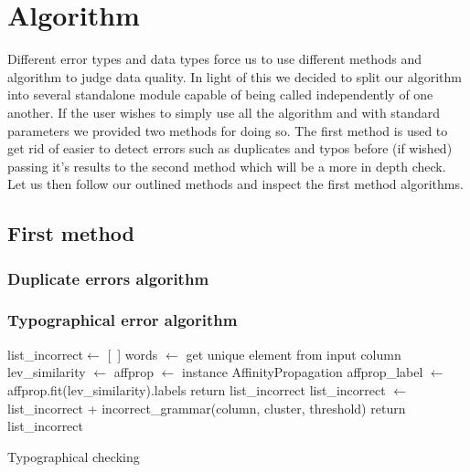 \documentclass{article}
\begin{document}
\section{Algorithm}
\label{sec:Algorithm}
Different error types and data types force us to use different methods and algorithm to judge data quality. In light of this we decided to split our algorithm into several standalone module capable of being called independently of one another.
If the user wishes to simply use all the algorithm and with standard parameters we provided two methods for doing so. The first method is used to get rid of easier to detect errors such as duplicates and typos before (if wished) passing it's results to the second method which will be a more in depth check.
Let us then follow our outlined methods and inspect the first method algorithms.


\subsection{First method}
\subsubsection{Duplicate errors algorithm}
\subsubsection{Typographical error algorithm}

\begin{algorithm}
\BlankLine

list\_incorrect$\leftarrow$ [~]\;
words $\leftarrow$ get unique element from input column\;
    {
    lev\_similarity $\leftarrow$ 
    affprop $\leftarrow$ instance AffinityPropagation\;
    affprop\_label $\leftarrow$ affprop.fit(lev\_similarity).labels \;
    {
        return list\_incorrect\;
    }
    {
        {list\_incorrect $\leftarrow$ list\_incorrect + incorrect\_grammar(column, cluster, threshold)\;}
    }
    return list\_incorrect
    }
\caption{Typographical checking\label{typo}}
\end{algorithm}
\end{document}
